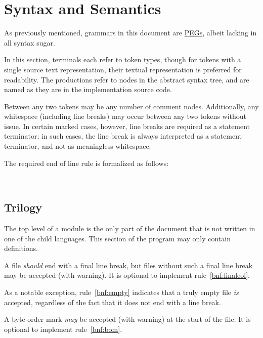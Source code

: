 \section{Syntax and Semantics}

As previously mentioned, grammars in this document are
\href{https://en.wikipedia.org/wiki/Parsing_expression_grammar}{PEGs},
albeit lacking in all syntax sugar.

In this section, terminals each refer to token types, though for tokens
with a single source text representation, their textual representation
is preferred for readability. The productions refer to nodes in the
abstract syntax tree, and are named as they are in the implementation
source code.

Between any two tokens may be any number of comment nodes. Additionally,
any whitespace (including line breaks) may occur between any two tokens
without issue. In certain marked cases, however, line breaks are required
as a statement terminator; in such cases, the line break is always interpreted
as a statement terminator, and not as meaningless whitespace.

The required end of line rule is formalized as follows:

\begin{bnf*}
     \\
\end{bnf*}

\subsection{Trilogy}

The top level of a \Trilogy{} module is the only part of the document that
is not written in one of the child languages. This section of the program
may only contain definitions.

A \Trilogy{} file \emph{should} end with a final line break,
but files without such a final line break may be accepted (with warning).
It is optional to implement rule~\ref{bnf:finaleol}.

As a notable exception, rule~\ref{bnf:empty} indicates that a truly empty file \emph{is}
accepted, regardless of the fact that it does not end with a line break.

A byte order mark \emph{may} be accepted (with warning) at the start of
the file. It is optional to implement rule~\ref{bnf:bom}.

